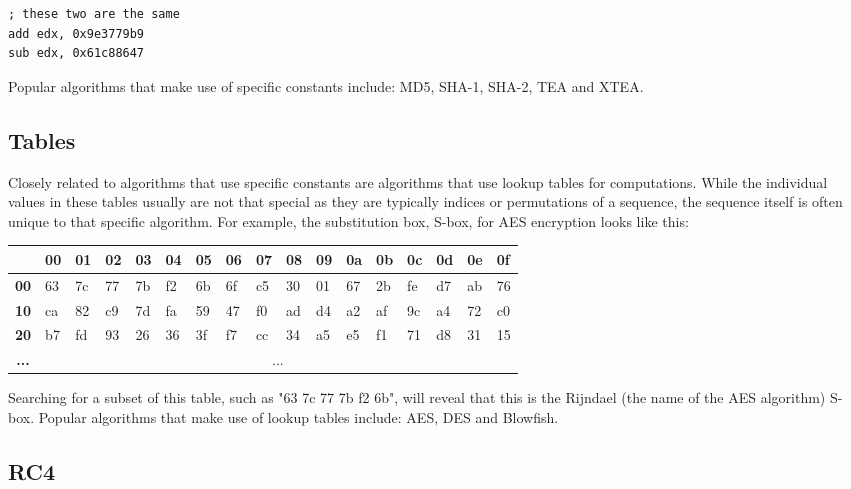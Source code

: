 \documentclass[twocolumn]{article}
\begin{document}
\begin{verbatim}
; these two are the same
add edx, 0x9e3779b9
sub edx, 0x61c88647
\end{verbatim}

\vspace*{-0.7\baselineskip}
Popular algorithms that make use of specific constants include: MD5, SHA-1, SHA-2, TEA and XTEA.
\vspace*{-1.2\baselineskip}


\subsection*{Tables}
\vspace*{-0.4\baselineskip}

Closely related to algorithms that use specific constants are algorithms that use lookup tables for computations. While the individual values in these tables usually are not that special as they are typically indices or permutations of a sequence, the sequence itself is often unique to that specific algorithm. For example, the substitution box, S-box, for AES encryption looks like this:

\begin{table}[!h]
\setlength{\tabcolsep}{3pt}
    \tiny
    \begin{tabular}{|>{\bfseries}c|l|l|l|l|l|l|l|l|l|l|l|l|l|l|l|l|}
\hline
   & \textbf{00} & \textbf{01} & \textbf{02} & \textbf{03} & \textbf{04} & \textbf{05} & \textbf{06} & \textbf{07} & \textbf{08} & \textbf{09} & \textbf{0a} & \textbf{0b} & \textbf{0c} & \textbf{0d} & \textbf{0e} & \textbf{0f} \\ \hline
00 & 63 & 7c & 77 & 7b & f2 & 6b & 6f & c5 & 30 & 01 & 67 & 2b & fe & d7 & ab & 76 \\ \hline
10 & ca & 82 & c9 & 7d & fa & 59 & 47 & f0 & ad & d4 & a2 & af & 9c & a4 & 72 & c0 \\ \hline
20 & b7 & fd & 93 & 26 & 36 & 3f & f7 & cc & 34 & a5 & e5 & f1 & 71 & d8 & 31 & 15 \\ 
... & \multicolumn{16}{c}{...}
    \end{tabular}
\end{table}

Searching for a subset of this table, such as "63 7c 77 7b f2 6b", will reveal that this is the Rijndael (the name of the AES algorithm) S-box. Popular algorithms that make use of lookup tables include: AES, DES and Blowfish.


\subsection*{RC4}
\end{document}
